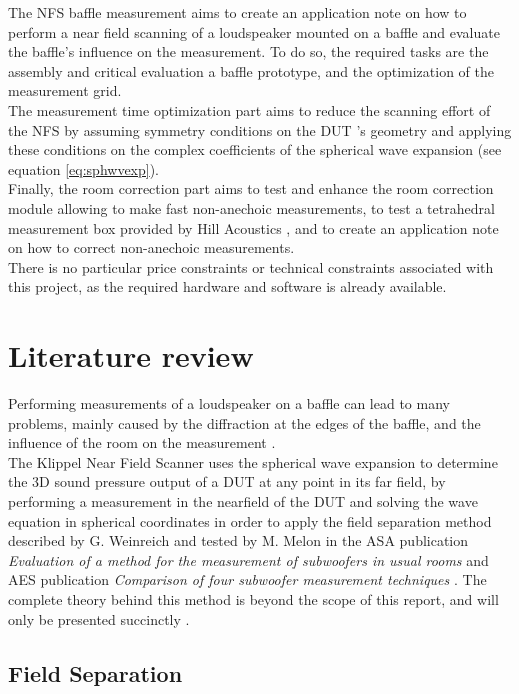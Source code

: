 \documentclass{report}
\begin{document}
The NFS baffle measurement aims to create an application note on how to perform a near field scanning of a loudspeaker mounted on a baffle and evaluate the baffle's influence on the measurement. To do so, the required tasks are the assembly and critical evaluation a baffle prototype, and the optimization of the measurement grid.\\
The measurement time optimization part aims to reduce the scanning effort of the NFS by assuming symmetry conditions on the DUT 's geometry and applying these conditions on the complex coefficients of the spherical wave expansion (see equation \ref{eq:sphwvexp}). \\
Finally, the room correction part aims to test and enhance the room correction module allowing to make fast non-anechoic measurements, to test a tetrahedral measurement box provided by Hill Acoustics \citep[see][]{tetbox}, and to create an application note on how to correct non-anechoic measurements. \\

There is no particular price constraints or technical constraints associated with this project, as the required hardware and software is already available. 

\newpage

\section{Literature review}

Performing measurements of a loudspeaker on a baffle can lead to many problems, mainly caused by the diffraction at the edges of the baffle, and the influence of the room on the measurement \cite{LIS}.\\
The Klippel Near Field Scanner uses the spherical wave expansion to determine the 3D sound pressure output of a DUT at any point in its far field, by performing a measurement in the nearfield of the DUT and solving the wave equation in spherical coordinates in order to apply the field separation method described by G. Weinreich and tested by M. Melon in the ASA publication \textit{Evaluation of a method for the measurement of subwoofers in usual rooms} and AES publication \textit{Comparison of four subwoofer measurement techniques}  \cite{melon1, melon2}. The complete theory behind this method is beyond the scope of this report, and will only be presented succinctly \citep[see][sect.~3]{aeshs} \citep[see][chap.~6]{Fourier}. 

\subsection{Field Separation}
\label{sec:FieldSep}
\end{document}
